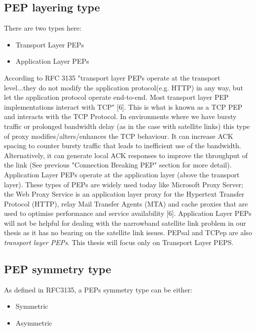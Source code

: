 \documentclass{uathesis}
\begin{document}
\subsection{PEP layering type}
There are two types here: \\
\begin{itemize}
\item Transport Layer PEPs
\item Application Layer PEPs\\
\end{itemize}

According to RFC 3135 "transport layer PEPs operate at the transport level...they do not modify the application protocol(e.g. HTTP) in any way, but let the application protocol operate end-to-end.  Most transport layer PEP implementations interact with TCP" [6]. This is what is known as a TCP PEP and interacts with the TCP Protocol. In environments where we have bursty traffic or prolonged bandwidth delay (as in the case with satellite links) this type of proxy modifies/alters/enhances the TCP behaviour. It can increase ACK spacing to counter bursty traffic that leads to inefficient use of the bandwidth. Alternatively, it can generate local ACK responses to improve the throughput of the link (See previous "Connection Breaking PEP" section for more detail).\\

Application Layer PEPs operate at the application layer (above the transport layer). These types of PEPs are widely used today like Microsoft Proxy Server; the Web Proxy Service is an application layer proxy for the Hypertext Transfer Protocol (HTTP), relay Mail Transfer Agents (MTA) and cache proxies that are used to optimise performance and service availability [6]. Application Layer PEPs will not be helpful for dealing with the narrowband satellite link problem in our thesis as it has no bearing on the satellite link issues. PEPsal and TCPep are also \emph{transport layer PEPs}. This thesis will focus only on Transport Layer PEPS.

\subsection{PEP symmetry type}
As defined in RFC3135, a PEPs symmetry type can be either:

\begin{itemize}
\item Symmetric
\item Asymmetric
\end{itemize}
\end{document}
